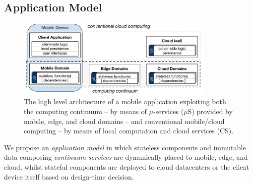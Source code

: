 




\subsection{Application Model}\label{sec:application_model}

\begin{figure}[tbp]
	\includegraphics[width=0.85\textwidth]{figs/Continuum-arch}
	\setlength{\belowcaptionskip}{-10pt}
	\caption{The high level architecture of a mobile application exploiting both the computing continuum -- by means of $\mu$-services ($\mu$S) provided by mobile, edge, and cloud domains -- and conventional mobile/cloud computing -- by means of local computation and cloud services (CS).}
	\label{fig:Continuum-arch}
\end{figure}

We propose an \textit{application model} in which stateless components and immutable data composing \textit{continuum services} are dynamically placed to mobile, edge, and cloud,
whilst 
stateful components are deployed to cloud datacenters or the client device itself based on design-time decision.

